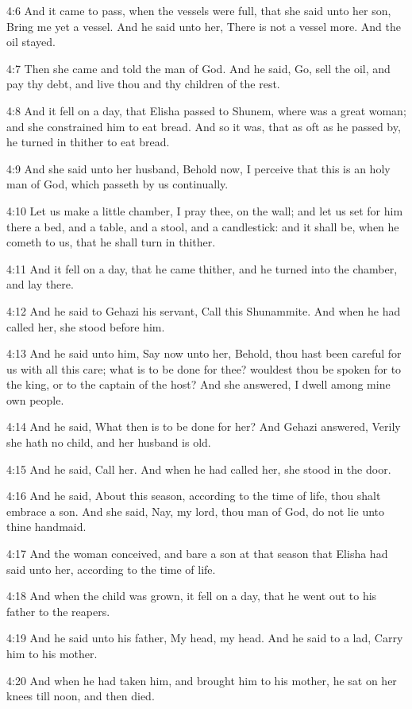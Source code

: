 4:6 And it came to pass, when the vessels were full, that she said
unto her son, Bring me yet a vessel. And he said unto her, There is
not a vessel more. And the oil stayed.

4:7 Then she came and told the man of God. And he said, Go, sell the
oil, and pay thy debt, and live thou and thy children of the rest.

4:8 And it fell on a day, that Elisha passed to Shunem, where was a
great woman; and she constrained him to eat bread. And so it was, that
as oft as he passed by, he turned in thither to eat bread.

4:9 And she said unto her husband, Behold now, I perceive that this is
an holy man of God, which passeth by us continually.

4:10 Let us make a little chamber, I pray thee, on the wall; and let
us set for him there a bed, and a table, and a stool, and a
candlestick: and it shall be, when he cometh to us, that he shall turn
in thither.

4:11 And it fell on a day, that he came thither, and he turned into
the chamber, and lay there.

4:12 And he said to Gehazi his servant, Call this Shunammite. And when
he had called her, she stood before him.

4:13 And he said unto him, Say now unto her, Behold, thou hast been
careful for us with all this care; what is to be done for thee?
wouldest thou be spoken for to the king, or to the captain of the
host? And she answered, I dwell among mine own people.

4:14 And he said, What then is to be done for her? And Gehazi
answered, Verily she hath no child, and her husband is old.

4:15 And he said, Call her. And when he had called her, she stood in
the door.

4:16 And he said, About this season, according to the time of life,
thou shalt embrace a son. And she said, Nay, my lord, thou man of God,
do not lie unto thine handmaid.

4:17 And the woman conceived, and bare a son at that season that
Elisha had said unto her, according to the time of life.

4:18 And when the child was grown, it fell on a day, that he went out
to his father to the reapers.

4:19 And he said unto his father, My head, my head. And he said to a
lad, Carry him to his mother.

4:20 And when he had taken him, and brought him to his mother, he sat
on her knees till noon, and then died.

